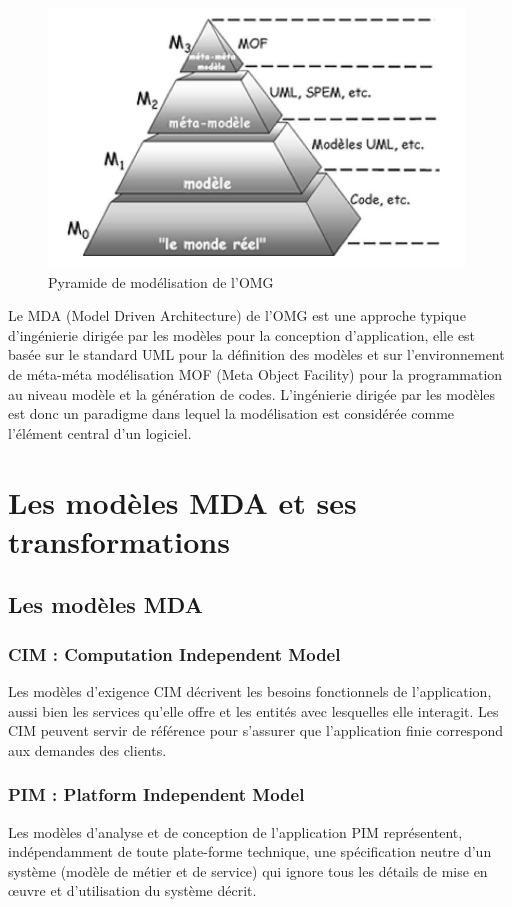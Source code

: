 \documentclass[
10pt, %
a4paper, %
oneside, %
headinclude,footinclude, %
BCOR5mm, %
]{report}
\begin{document}
    \begin{figure}[H] 
    \centering     
		\includegraphics[scale=0.8]{Figures/Pyramide_de_modelisation.png}
		\caption{Pyramide de modélisation de l'OMG \citep{PyramideMDA}}
		\end{figure}  
    
    Le MDA (Model Driven Architecture) de l’OMG est une approche typique d’ingénierie dirigée par les modèles pour la conception d’application, elle est basée sur le standard UML pour la définition des modèles et sur l’environnement de méta-méta modélisation MOF (Meta Object Facility) pour la programmation au niveau modèle et la génération de codes.
		L'ingénierie dirigée par les modèles est donc un paradigme dans lequel la modélisation est considérée comme l'élément central d'un logiciel.   
					
		\section{Les modèles MDA et ses transformations}
					
		\subsection{Les modèles MDA}
		\subsubsection{ CIM : Computation Independent Model }
		Les  modèles d'exigence CIM décrivent les besoins fonctionnels de l'application, aussi bien les services qu'elle offre et les entités avec lesquelles elle interagit. Les CIM peuvent servir de référence pour s'assurer que l'application finie correspond aux demandes des clients.
		\subsubsection{ PIM : Platform Independent Model}
		Les modèles d’analyse et de conception de l’application PIM représentent, indépendamment de toute plate-forme technique, une  spécification neutre d'un système (modèle de métier et de service) qui ignore tous les détails de mise en œuvre et d’utilisation du système décrit.
\end{document}

